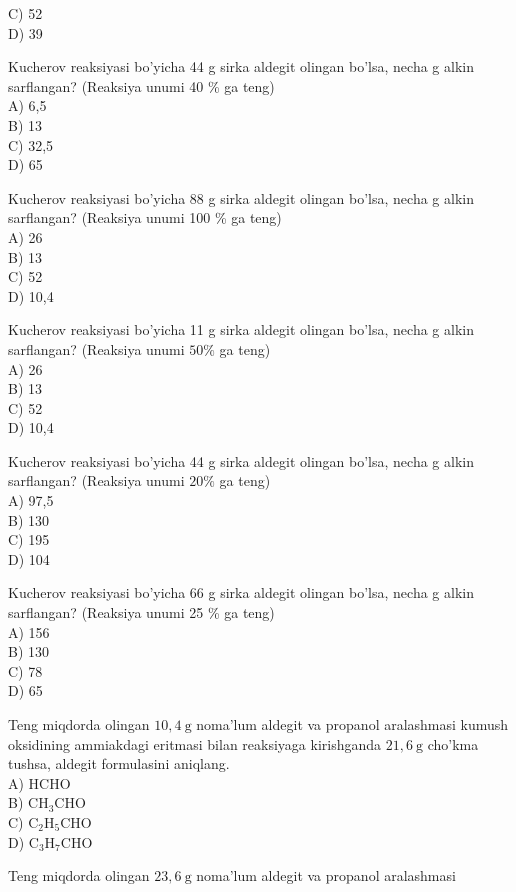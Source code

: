 C) 52\\
D) 39
  \item Kucherov reaksiyasi bo'yicha 44 g sirka aldegit olingan bo'lsa, necha g alkin sarflangan? (Reaksiya unumi 40 \% ga teng)\\
A) 6,5\\
B) 13\\
C) 32,5\\
D) 65
  \item Kucherov reaksiyasi bo'yicha 88 g sirka aldegit olingan bo'lsa, necha g alkin sarflangan? (Reaksiya unumi 100 \% ga teng)\\
A) 26\\
B) 13\\
C) 52\\
D) 10,4
  \item Kucherov reaksiyasi bo'yicha 11 g sirka aldegit olingan bo'lsa, necha g alkin sarflangan? (Reaksiya unumi $50 \%$ ga teng)\\
A) 26\\
B) 13\\
C) 52\\
D) 10,4
  \item Kucherov reaksiyasi bo'yicha 44 g sirka aldegit olingan bo'lsa, necha g alkin sarflangan? (Reaksiya unumi $20 \%$ ga teng)\\
A) 97,5\\
B) 130\\
C) 195\\
D) 104
  \item Kucherov reaksiyasi bo'yicha 66 g sirka aldegit olingan bo'lsa, necha g alkin sarflangan? (Reaksiya unumi 25 \% ga teng)\\
A) 156\\
B) 130\\
C) 78\\
D) 65
  \item Teng miqdorda olingan $10,4 \mathrm{~g}$ noma'lum aldegit va propanol aralashmasi kumush oksidining ammiakdagi eritmasi bilan reaksiyaga kirishganda $21,6 \mathrm{~g}$ cho'kma tushsa, aldegit formulasini aniqlang.\\
A) HCHO\\
B) $\mathrm{CH}_{3} \mathrm{CHO}$\\
C) $\mathrm{C}_{2} \mathrm{H}_{5} \mathrm{CHO}$\\
D) $\mathrm{C}_{3} \mathrm{H}_{7} \mathrm{CHO}$
  \item Teng miqdorda olingan $23,6 \mathrm{~g}$ noma'lum aldegit va propanol aralashmasi\\

